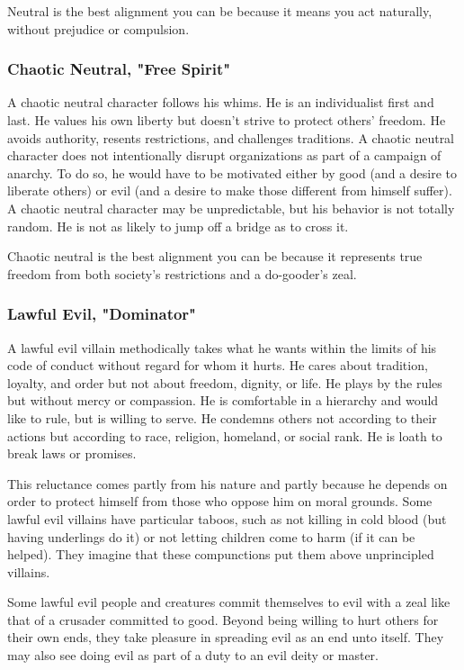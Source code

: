 Neutral is the best alignment you can be because it means you act naturally, without 
prejudice or compulsion.

\subsubsection{Chaotic Neutral, "Free Spirit"}
A chaotic neutral character follows 
his whims. He is an individualist first and last. He values his own liberty but 
doesn't strive to protect others' freedom. He avoids authority, resents restrictions, 
and challenges traditions. A chaotic neutral character does not intentionally disrupt 
organizations as part of a campaign of anarchy. To do so, he would have to be motivated 
either by good (and a desire to liberate others) or evil (and a desire to make 
those different from himself suffer). A chaotic neutral character may be unpredictable, 
but his behavior is not totally random. He is not as likely to jump off a bridge 
as to cross it.

Chaotic neutral is the best alignment you can be because it represents true freedom 
from both society's restrictions and a do-gooder's zeal.

\subsubsection{Lawful Evil, "Dominator"}
A lawful evil villain methodically takes what 
he wants within the limits of his code of conduct without regard for whom it hurts. 
He cares about tradition, loyalty, and order but not about freedom, dignity, or 
life. He plays by the rules but without mercy or compassion. He is comfortable 
in a hierarchy and would like to rule, but is willing to serve. He condemns others 
not according to their actions but according to race, religion, homeland, or social 
rank. He is loath to break laws or promises.

This reluctance comes partly from his nature and partly because he depends on order 
to protect himself from those who oppose him on moral grounds. Some lawful evil 
villains have particular taboos, such as not killing in cold blood (but having 
underlings do it) or not letting children come to harm (if it can be helped). They 
imagine that these compunctions put them above unprincipled villains.

Some lawful evil people and creatures commit themselves to evil with a zeal like 
that of a crusader committed to good. Beyond being willing to hurt others for their 
own ends, they take pleasure in spreading evil as an end unto itself. They may 
also see doing evil as part of a duty to an evil deity or master.

